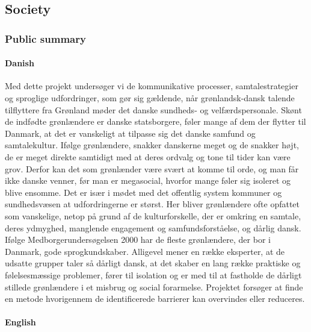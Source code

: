 \documentclass[twocolumn, issue, rga, authordate]{jote-new-article}
\begin{document}
\subsection{Society}



\subsubsection{Public summary}


\paragraph{Danish}

Med dette projekt undersøger vi de kommunikative processer, samtalestrategier og sproglige udfordringer, som gør sig gældende, når grønlandsk-dansk talende tilflyttere fra Grønland møder det danske sundheds- og velfærdspersonale. Skønt de indfødte grønlændere er danske statsborgere, føler mange af dem der flytter til Danmark, at det er vanskeligt at tilpasse sig det danske samfund og samtalekultur. Ifølge grønlændere, snakker danskerne meget og de snakker højt, de er meget direkte samtidigt med at deres ordvalg og tone til tider kan være grov.
Derfor kan det som grønlænder være svært at komme til orde, og man får ikke danske venner, før man er megasocial, hvorfor mange føler sig isoleret og blive ensomme. Det er især i mødet med det offentlig system kommuner og sundhedsvæsen at udfordringerne er størst. Her bliver grønlændere ofte opfattet som vanskelige, netop på grund af de kulturforskelle, der er omkring en samtale, deres ydmyghed, manglende engagement og samfundsforståelse, og dårlig dansk. Ifølge Medborgerundersøgelsen 2000 har de fleste grønlændere, der bor i Danmark, gode sprogkundskaber. Alligevel mener en række eksperter, at de udsatte grupper taler så dårligt dansk, at det skaber en lang række praktiske og følelsesmæssige problemer, fører til isolation og er med til at fastholde de dårligt stillede grønlændere i et misbrug og social forarmelse. Projektet forsøger at finde en metode hvorigennem de identificerede barrierer kan overvindes eller reduceres.

\paragraph{English}
\end{document}
